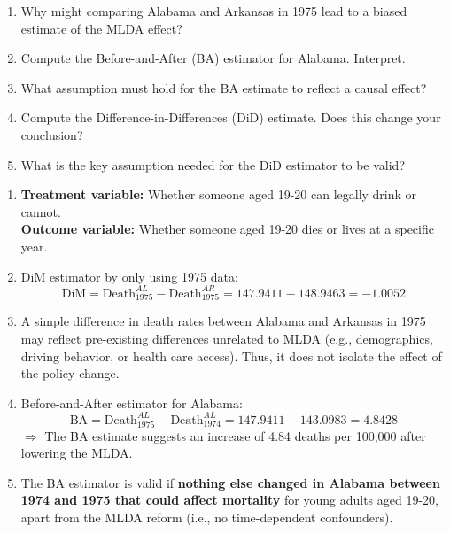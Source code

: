 \documentclass[11pt]{exam}
\begin{document}
\begin{questions}
\begin{enumerate}[label=(\alph*)]
    \item Why might comparing Alabama and Arkansas in 1975 lead to a biased estimate of the MLDA effect?
    
    \item Compute the Before-and-After (BA) estimator for Alabama. Interpret.
    
    \item What assumption must hold for the BA estimate to reflect a causal effect?
    
    \item Compute the Difference-in-Differences (DiD) estimate. Does this change your conclusion?
    
    \item What is the key assumption needed for the DiD estimator to be valid?
\end{enumerate}

\begin{solution}

\begin{enumerate}[label=(\alph*)]
    \item \textbf{Treatment variable:} Whether someone aged 19-20 can legally drink or cannot.
    \\
    \textbf{Outcome variable:} Whether someone aged 19-20 dies or lives at a specific year.

    \item DiM estimator by only using 1975 data:
    $$
    \text{DiM} = \text{Death}_{1975}^{AL} - \text{Death}_{1975}^{AR} = 147.9411 - 148.9463 = \boxed{-1.0052}
    $$
    
    \item A simple difference in death rates between Alabama and Arkansas in 1975 may reflect pre-existing differences unrelated to MLDA (e.g., demographics, driving behavior, or health care access). Thus, it does not isolate the effect of the policy change.

    \item Before-and-After estimator for Alabama:
    $$
    \text{BA} = \text{Death}_{1975}^{AL} - \text{Death}_{1974}^{AL} = 147.9411 - 143.0983 = \boxed{4.8428}
    $$
    $\Rightarrow$ The BA estimate suggests an increase of 4.84 deaths per 100,000 after lowering the MLDA.

    \item The BA estimator is valid if \textbf{nothing else changed in Alabama between 1974 and 1975 that could affect mortality} for young adults aged 19-20, apart from the MLDA reform (i.e., no time-dependent confounders).


\end{enumerate}
\end{solution}
\end{questions}
\end{document}

